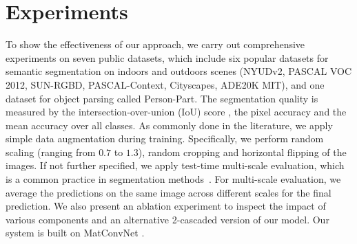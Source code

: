 \documentclass[10pt,twocolumn,letterpaper]{article}
\begin{document}
\section{Experiments}\label{sec:experiments}
To show the effectiveness of our approach, we carry out comprehensive experiments on seven public datasets, which include six popular datasets for semantic segmentation on indoors and outdoors scenes (NYUDv2, PASCAL VOC 2012, SUN-RGBD, PASCAL-Context, Cityscapes, ADE20K MIT), and one dataset for object parsing called Person-Part.
The segmentation quality is measured by the intersection-over-union (IoU) score \cite{everingham2010pascal}, the pixel accuracy and the mean accuracy \cite{LongSD14} over all classes.
As commonly done in the literature, we apply simple data augmentation during training. Specifically, we perform random scaling (ranging from $0.7$ to $1.3$), random cropping and horizontal flipping of the images.
If not further specified, we apply test-time multi-scale evaluation, which is a common practice in segmentation methods~\cite{Dai2015arXiv,ChenPK0Y16}.
For multi-scale evaluation, we average the predictions on the same image across different scales for the final prediction.
We also present an ablation experiment to inspect the impact of various components and an alternative 2-cascaded version of our model.
Our system is built on MatConvNet \cite{matconvnet}.
\end{document}
